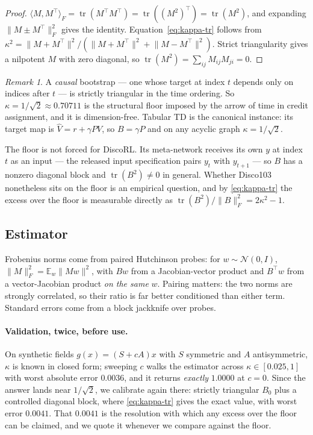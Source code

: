 \documentclass[11pt]{article}
\theoremstyle{remark}
\newtheorem*{remark}{Remark}
\newcommand{\tr}{\operatorname{tr}}
\newcommand{\E}{\mathbb{E}}
\begin{document}
\begin{proof}
$\langle M, M^\top\rangle_F = \tr(M^\top M^\top) = \tr((M^2)^\top) = \tr(M^2)$,
and expanding $\lVert M \pm M^\top \rVert_F^2$ gives the identity.
Equation~\eqref{eq:kappa-tr} follows from
$\kappa^2 = \lVert M + M^\top\rVert^2 / (\lVert M + M^\top\rVert^2 + \lVert M -
M^\top\rVert^2)$. Strict triangularity gives a nilpotent $M$ with zero diagonal,
so $\tr(M^2) = \sum_{ij} M_{ij}M_{ji} = 0$.
\end{proof}

\begin{remark}
A \emph{causal} bootstrap --- one whose target at index $t$ depends only on
indices after $t$ --- is strictly triangular in the time ordering. So
$\kappa = 1/\sqrt 2 \approx 0.70711$ is the structural floor imposed by the arrow
of time in credit assignment, and it is dimension-free. Tabular TD is the
canonical instance: its target map is $\hat V = r + \gamma P V$, so $B = \gamma P$
and on any acyclic graph $\kappa = 1/\sqrt 2$.
\end{remark}

The floor is not forced for DiscoRL. Its meta-network receives its own $y$ at
index $t$ as an input --- the released input specification pairs $y_t$ with
$y_{t+1}$ --- so $B$ has a nonzero diagonal block and $\tr(B^2) \neq 0$ in
general. Whether Disco103 nonetheless sits on the floor is an empirical question,
and by \eqref{eq:kappa-tr} the excess over the floor is measurable directly as
$\tr(B^2)/\lVert B\rVert_F^2 = 2\kappa^2 - 1$.

\subsection{Estimator}

Frobenius norms come from paired Hutchinson probes: for $w \sim \mathcal N(0, I)$,
$\lVert M \rVert_F^2 = \E_w \lVert M w\rVert^2$, with $Bw$ from a
Jacobian-vector product and $B^\top w$ from a vector-Jacobian product \emph{on the
same} $w$. Pairing matters: the two norms are strongly correlated, so their ratio
is far better conditioned than either term. Standard errors come from a block
jackknife over probes.

\paragraph{Validation, twice, before use.}
On synthetic fields $g(x) = (S + cA)x$ with $S$ symmetric and $A$ antisymmetric,
$\kappa$ is known in closed form; sweeping $c$ walks the estimator across
$\kappa \in [0.025, 1]$ with worst absolute error $0.0036$, and it returns
\emph{exactly} $1.0000$ at $c = 0$. Since the answer lands near $1/\sqrt 2$, we
calibrate again there: strictly triangular $B_0$ plus a controlled diagonal block,
where \eqref{eq:kappa-tr} gives the exact value, with worst error $0.0041$. That
$0.0041$ is the resolution with which any excess over the floor can be claimed,
and we quote it whenever we compare against the floor.
\end{document}
